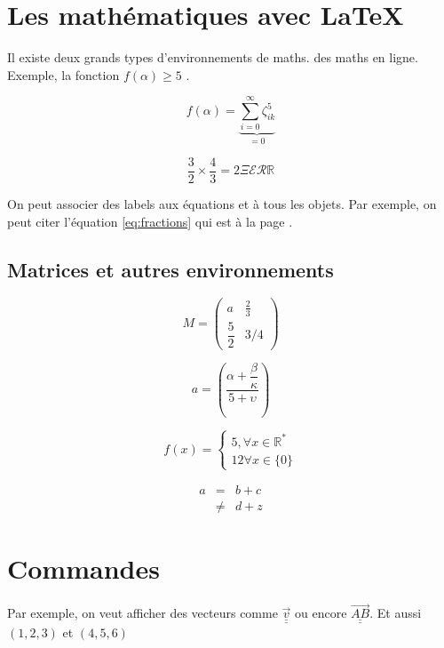 \documentclass[a4paper, twoside, 10pt]{article}
\begin{document}
\section{Les mathématiques avec \LaTeX}

Il existe deux grands types d'environnements de maths. des maths en ligne. Exemple, la fonction $f(\alpha) \geq 5$ . 

$$
f(\alpha) = \underbrace{
			   \sum_{i = 0}^\infty \zeta_{ik}^5
			          }_{=0}		          
$$

\begin{equation}
\frac{3}{2} \times \frac{4}{3} = 2 \Xi \mathcal E \mathcal R \mathbb R
\label{eq:fractions}
\end{equation}

On peut associer des labels aux équations et à tous les objets. Par exemple, on peut citer l'équation \ref{eq:fractions} qui est à la page \pageref{eq:fractions}.

\subsection{Matrices et autres environnements}

\begin{equation}
M = 
\begin{pmatrix}
a & \frac{2}{3} \\
\dfrac{5}{2} & 3/4 
\end{pmatrix}
\end{equation}

$$
a = \left(
	\dfrac{\alpha + \dfrac{\beta}{\kappa}}{5+\upsilon}                                                               
	\right)
$$


$$
f(x) = \left\lbrace 
       \begin{split}
       5 , \forall x \in \mathbb R^* \\
       12 \forall x \in \lbrace 0 \rbrace  
       \end{split}
       \right.
$$

\begin{eqnarray}
a & = &  b + c \\
  & \neq & d + z
\end{eqnarray}

\section{Commandes}
\newcommand{\myvec}[1]{\vec{ \underline{\underline{#1}}} } %
\newcommand{\myvecc}[3]{ (#1, #2, #3) } %

Par exemple, on veut afficher des vecteurs comme $ \myvec v$ ou encore $\myvec{AB}$. Et aussi $\myvecc{1}{2}{3}$  et $\myvecc 456$
\end{document}
